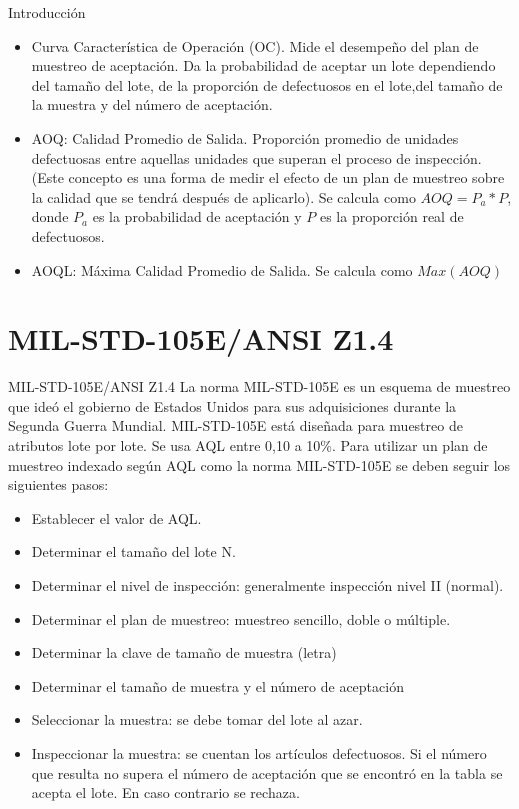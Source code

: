 \documentclass[10pt]{beamer}
\begin{document}
\begin{frame}{Introducción}
\begin{itemize}
\item Curva Característica de Operación (OC). Mide el desempeño del plan de muestreo de aceptación. Da la probabilidad de aceptar un lote dependiendo del tamaño del lote, de la proporción de defectuosos en el lote,del tamaño de la muestra y del número de aceptación.
\item AOQ: Calidad Promedio de Salida. Proporción promedio de unidades defectuosas entre aquellas unidades que superan el proceso de inspección. (Este concepto es una forma de medir el efecto de un plan de muestreo sobre la calidad que se tendrá después de aplicarlo). Se calcula como $AOQ=P_a*P$, donde $P_a$ es la probabilidad de aceptación y $P$ es la proporción real de defectuosos.
\item AOQL: Máxima Calidad Promedio de Salida. Se calcula como $Max(AOQ)$
\end{itemize}
\end{frame}

\section{MIL-STD-105E/ANSI Z1.4}
\begin{frame}{MIL-STD-105E/ANSI Z1.4}
La norma MIL-STD-105E es un esquema de muestreo que ideó el gobierno de Estados Unidos para sus adquisiciones durante la Segunda Guerra Mundial. MIL-STD-105E está diseñada para muestreo de atributos lote por lote. Se usa AQL entre 0,10 a 10\%. Para utilizar un plan de muestreo indexado según AQL como la norma MIL-STD-105E se deben seguir los siguientes pasos:
\begin{itemize}
\item[1.] Establecer el valor de AQL.
\item[2.] Determinar el tamaño del lote N.
\item[3.] Determinar el nivel de inspección: generalmente inspección nivel II (normal).
\item[4.] Determinar el plan de muestreo: muestreo sencillo, doble o múltiple.
\item[5.] Determinar la clave de tamaño de muestra (letra)
\item[6.] Determinar el tamaño de muestra y el número de aceptación
\item[7.] Seleccionar la muestra: se debe tomar del lote al azar.
\item[8.] Inspeccionar la muestra: se cuentan los artículos defectuosos. Si el número que resulta no supera el número de aceptación que se encontró en la tabla se acepta el lote. En caso contrario se rechaza.
\end{itemize}
\end{frame}
\end{document}
